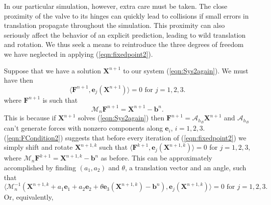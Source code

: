 \documentclass[preprint,12pt]{elsarticle}
\begin{document}
In our particular simulation, however, extra care must be taken. The close proximity of the valve to its hinges can quickly lead to collisions 
if small errors in translation propagate throughout the simulation. 
This proximity can also seriously affect the behavior of an explicit prediction, leading to wild translation and rotation. We thus seek a means to reintroduce the three degrees of freedom we have neglected in applying (\ref{eqn:fixedpoint2}).

Suppose that we have a solution $\mathbf{X}^{n+1}$ to our system (\ref{eqn:Sys2again}). We must have then
\begin{equation}
\langle \mathbf{F}^{n+1}, \mathbf{e}_j(\mathbf{X}^{n+1}) \rangle = 0
\textrm{ for } j=1,2,3.
\label{eqn:FCondition2}
\end{equation}
where $\mathbf{F}^{n+1}$ is such that 
\begin{equation}
\mathcal{M}_n\mathbf{F}^{n+1}=\mathbf{X}^{n+1}-\mathbf{b}^n.
\end{equation}
This is because if $\mathbf{X}^{n+1}$ solves (\ref{eqn:Sys2again}) then $\mathbf{F}^{n+1} = \mathcal{A}_{h_B}\mathbf{X}^{n+1}$ and $\mathcal{A}_{h_B}$ can't generate forces with nonzero components along $\mathbf{e}_i$, $i=1,2,3$.
(\ref{eqn:FCondition2}) suggests that before every iteration of (\ref{eqn:fixedpoint2}) we simply shift and rotate $\mathbf{X}^{n+1,k}$ such that 
$\langle \mathbf{F}^{k+1}, \mathbf{e}_j(\mathbf{X}^{n+1,k}) \rangle = 0$ for $j=1,2,3$, where $\mathcal{M}_n\mathbf{F}^{k+1}=\mathbf{X}^{n+1,k}-\mathbf{b}^n$ as before. This can be approximately accomplished by finding $(a_1,a_2)$ and $\theta$, a translation vector and an angle, such that
\begin{equation}
\langle \mathcal{M}_n^{-1}(\mathbf{X}^{n+1,k}+a_1\mathbf{e}_1+a_2\mathbf{e}_2+\theta\mathbf{e}_3(\mathbf{X}^{n+1,k})-\mathbf{b}^n),  \mathbf{e}_j(\mathbf{X}^{n+1,k}) \rangle = 0 \textrm{ for } j=1,2,3.
\label{eqn:ProjFree}
\end{equation}
Or, equivalently,
\end{document}
